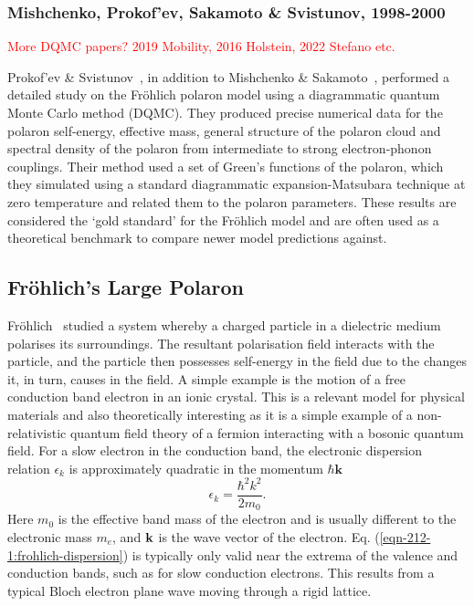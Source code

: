 \subsubsection{Mishchenko, Prokof’ev, Sakamoto \& Svistunov, 1998-2000}
\label{subsubsec:2-1-1-9}

\textcolor{red}{More DQMC papers? 2019 Mobility, 2016 Holstein, 2022 Stefano etc.}

Prokof’ev \& Svistunov~\cite{prokofev_polaron_1998}, in addition to Mishchenko \& Sakamoto~\cite{mishchenko_diagrammatic_2000}, performed a detailed study on the Fr\"ohlich polaron model using a diagrammatic quantum Monte Carlo method (DQMC). They produced precise numerical data for the polaron self-energy, effective mass, general structure of the polaron cloud and spectral density of the polaron from intermediate to strong electron-phonon couplings. Their method used a set of Green's functions of the polaron, which they simulated using a standard diagrammatic expansion-Matsubara technique at zero temperature and related them to the polaron parameters. These results are considered the `gold standard' for the Fr\"ohlich model and are often used as a theoretical benchmark to compare newer model predictions against.

\subsection{Fr\"ohlich's Large Polaron}
\label{subsec:2-1-2}

Fr\"ohlich~\cite{frohlich_electrons_1954} studied a system whereby a charged particle in a dielectric medium polarises its surroundings. The resultant polarisation field interacts with the particle, and the particle then possesses self-energy in the field due to the changes it, in turn, causes in the field. A simple example is the motion of a free conduction band electron in an ionic crystal. This is a relevant model for physical materials and also theoretically interesting as it is a simple example of a non-relativistic quantum field theory of a fermion interacting with a bosonic quantum field. For a slow electron in the conduction band, the electronic dispersion relation $\epsilon_k$ is approximately quadratic in the momentum $\hbar \textbf{k}$ 
\begin{equation}
    \epsilon_k = \frac{\hbar^2 k^2}{2 m_0}.
\label{eqn-212-1:frohlich-dispersion}
\end{equation}
Here $m_0$ is the effective band mass of the electron and is usually different to the electronic mass $m_e$, and $\vb{k}$ is the wave vector of the electron. Eq. (\ref{eqn-212-1:frohlich-dispersion}) is typically only valid near the extrema of the valence and conduction bands, such as for slow conduction electrons. This results from a typical Bloch electron plane wave moving through a rigid lattice.  

